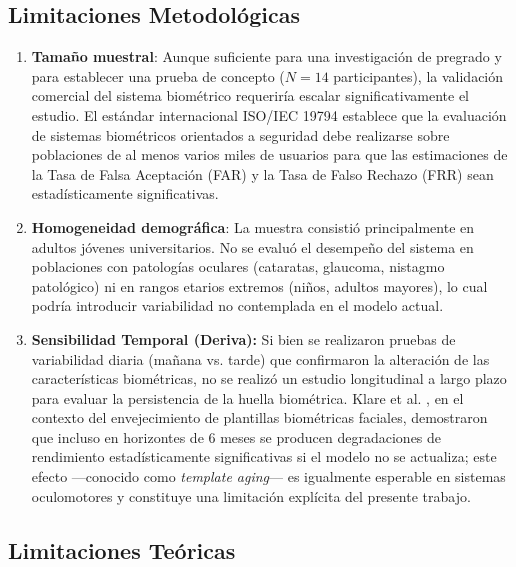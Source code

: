 \subsection{Limitaciones Metodológicas}

\begin{enumerate}
	\item \textbf{Tamaño muestral}: Aunque suficiente para una investigación de pregrado y para establecer una prueba de concepto ($N=14$ participantes), la validación comercial del sistema biométrico requeriría escalar significativamente el estudio.
	El estándar internacional ISO/IEC 19794 \cite{iso19794} establece que la evaluación de sistemas biométricos orientados a seguridad debe realizarse sobre poblaciones de al menos varios miles de usuarios para que las estimaciones de la Tasa de Falsa Aceptación (FAR) y la Tasa de Falso Rechazo (FRR) sean estadísticamente significativas.
	\item \textbf{Homogeneidad demográfica}: La muestra consistió principalmente en adultos jóvenes universitarios.
	No se evaluó el desempeño del sistema en poblaciones con patologías oculares (cataratas, glaucoma, nistagmo patológico) ni en rangos etarios extremos (niños, adultos mayores), lo cual podría introducir variabilidad no contemplada en el modelo actual.
	\item \textbf{Sensibilidad Temporal (Deriva):} Si bien se realizaron pruebas de variabilidad diaria (mañana vs. tarde) que confirmaron la alteración de las características biométricas, no se realizó un estudio longitudinal a largo plazo para evaluar la persistencia de la huella biométrica.
	Klare et al. \cite{klare2012face}, en el contexto del envejecimiento de plantillas biométricas faciales, demostraron que incluso en horizontes de 6 meses se producen degradaciones de rendimiento estadísticamente significativas si el modelo no se actualiza;
	este efecto —conocido como \textit{template aging}— es igualmente esperable en sistemas oculomotores y constituye una limitación explícita del presente trabajo.
\end{enumerate}

\subsection{Limitaciones Teóricas}

